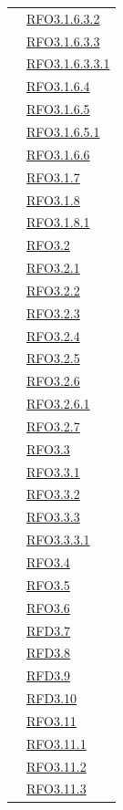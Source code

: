 \begin{itemize}
\begin{itemize}
\begin{itemize}
\begin{itemize}
\begin{longtable}{|>{\centering}m{5cm}|m{5cm}<{\centering}|}
& \hyperlink{RFO3.1.6.3.2}{RFO3.1.6.3.2}\\
& \hyperlink{RFO3.1.6.3.3}{RFO3.1.6.3.3}\\
& \hyperlink{RFO3.1.6.3.3.1}{RFO3.1.6.3.3.1}\\
& \hyperlink{RFO3.1.6.4}{RFO3.1.6.4}\\
& \hyperlink{RFO3.1.6.5}{RFO3.1.6.5}\\
& \hyperlink{RFO3.1.6.5.1}{RFO3.1.6.5.1}\\
& \hyperlink{RFO3.1.6.6}{RFO3.1.6.6}\\
& \hyperlink{RFO3.1.7}{RFO3.1.7}\\
& \hyperlink{RFO3.1.8}{RFO3.1.8}\\
& \hyperlink{RFO3.1.8.1}{RFO3.1.8.1}\\
& \hyperlink{RFO3.2}{RFO3.2}\\
& \hyperlink{RFO3.2.1}{RFO3.2.1}\\
& \hyperlink{RFO3.2.2}{RFO3.2.2}\\
& \hyperlink{RFO3.2.3}{RFO3.2.3}\\
& \hyperlink{RFO3.2.4}{RFO3.2.4}\\
& \hyperlink{RFO3.2.5}{RFO3.2.5}\\
& \hyperlink{RFO3.2.6}{RFO3.2.6}\\
& \hyperlink{RFO3.2.6.1}{RFO3.2.6.1}\\
& \hyperlink{RFO3.2.7}{RFO3.2.7}\\
& \hyperlink{RFO3.3}{RFO3.3}\\
& \hyperlink{RFO3.3.1}{RFO3.3.1}\\
& \hyperlink{RFO3.3.2}{RFO3.3.2}\\
& \hyperlink{RFO3.3.3}{RFO3.3.3}\\
& \hyperlink{RFO3.3.3.1}{RFO3.3.3.1}\\
& \hyperlink{RFO3.4}{RFO3.4}\\
& \hyperlink{RFO3.5}{RFO3.5}\\
& \hyperlink{RFO3.6}{RFO3.6}\\
& \hyperlink{RFD3.7}{RFD3.7}\\
& \hyperlink{RFD3.8}{RFD3.8}\\
& \hyperlink{RFD3.9}{RFD3.9}\\
& \hyperlink{RFD3.10}{RFD3.10}\\
& \hyperlink{RFO3.11}{RFO3.11}\\
& \hyperlink{RFO3.11.1}{RFO3.11.1}\\
& \hyperlink{RFO3.11.2}{RFO3.11.2}\\
& \hyperlink{RFO3.11.3}{RFO3.11.3}\\

\end{longtable}
\end{itemize}
\end{itemize}
\end{itemize}
\end{itemize}

